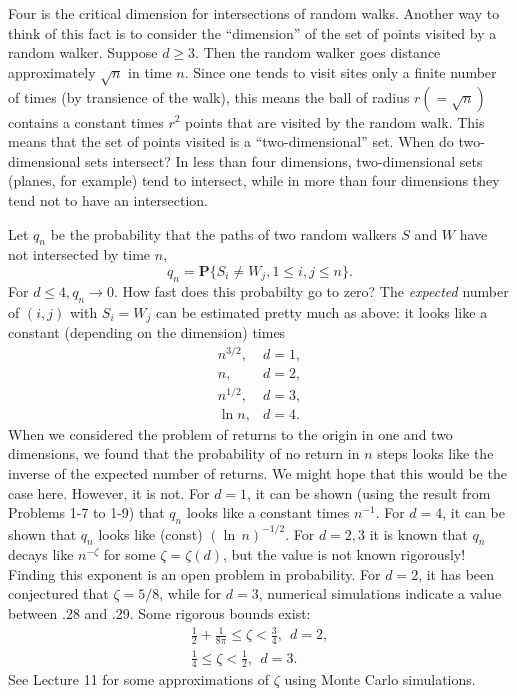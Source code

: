 \documentclass{stml-l}
\theoremstyle{definition}
\numberwithin{equation}{chapter}
\numberwithin{figure}{chapter}
\numberwithin{figure}{section}
\begin{document}
Four is the critical dimension for intersections of random walks.
Another way to think of this fact is to consider the ``dimension''
of the set of points visited by a random walker. Suppose $d\geq 3$.
Then the random walker goes distance approximately $\sqrt{n}$ in
time $n$. Since one tends to visit sites only a finite number of
times (by transience of the walk), this means the ball of radius
$r(=\sqrt{n})$ contains a constant times $r^{2}$ points that are
visited by the random walk. This means that the set of points
visited is a ``two-dimensional'' set. When do two-dimensional sets
intersect? In less than four dimensions, two-dimensional sets
(planes, for example) tend to intersect, while in more than four
dimensions they tend not to have an intersection.

Let $q_{n}$ be the probability that the paths of two random walkers
$S$ and $W$ have not intersected by time $n$,
\begin{equation*}
q_{n}=\mathbf{P}\{S_{i}\neq W_{j},1\leq i,j\leq n\}.
\end{equation*}
For $d\leq 4,q_{n}\rightarrow 0$. How fast does this probabilty go
to zero? The \emph{expected} number of $(i,j)$ with $S_{i}=W_{j}$
can be estimated pretty much as above: it looks like a constant
(depending on the dimension) times
\begin{equation*}
\begin{array}{ll}n^{3/2},& d=1,\\
n,& d=2,\\
n^{1/2},& d=3,\\
\ln n,& d=4.\end{array}
\end{equation*}
When we considered the problem of returns to the origin in one and
two dimensions, we found that the probability of no return in $n$
steps looks like the inverse of the expected number of returns. We
might hope that this would be the case here. However, it is not. For
$d=1$, it can be shown (using the result from Problems 1-7 to 1-9)
that $q_{n}$ looks like a constant times $n^{-1}$. For $d=4$, it can
be shown that $q_{n}$ looks like (const) $(\ln\,n)^{-1/2}$. For
$d=2,3$ it is known that $q_{n}$ decays like $n^{-\zeta}$ for some
$\zeta=\zeta(d)$, but the value is not known rigorously! Finding
this exponent is an open problem in probability. For $d=2$, it has
been conjectured that $\zeta=5/8$, while for $d=3$, numerical
simulations indicate a value between .28 and .29. Some rigorous bounds
exist:
\begin{gather*}
\frac{1}{2}+\frac{1}{8\pi}\leq\zeta<\frac{3}{4},\ \ d=2,\\
\frac{1}{4}\leq\zeta<\frac{1}{2},\ \ d=3.
\end{gather*}
See Lecture 11 for some approximations of $\zeta$ using Monte Carlo
simulations.
\end{document}
